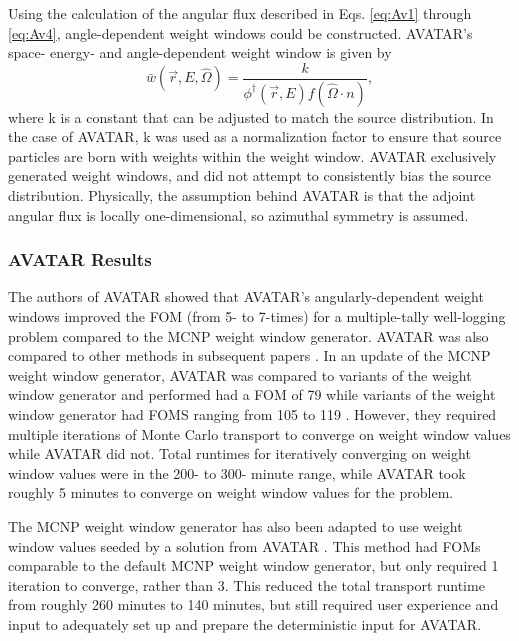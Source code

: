 Using the calculation of the angular flux described in Eqs. \eqref{eq:Av1}
through \eqref{eq:Av4}, angle-dependent weight windows could be constructed.
AVATAR's space- energy- and angle-dependent weight window is given by
\begin{equation}
\bar {w} (\vec{r},E,\hat\Omega) = \frac{k}{\phi^{\dagger}(\vec{r},E)
                                  f(\hat\Omega \cdot n)},
\end{equation}
where k is a constant that can be adjusted to match the source distribution.
In the case of AVATAR, k was used as a normalization factor to ensure that
source particles are born with weights within the weight window.
AVATAR exclusively generated weight windows, and did not attempt to consistently
bias the source
distribution. Physically, the assumption behind AVATAR is that the adjoint
angular flux
is locally one-dimensional, so azimuthal symmetry is assumed.

\subsubsection*{AVATAR Results}

The authors of AVATAR showed that AVATAR's angularly-dependent
weight windows improved the FOM (from 5- to 7-times) for a multiple-tally well-logging
problem compared to the MCNP weight window generator. AVATAR was also compared
to other methods in subsequent papers \cite{evans_enhanced_1998}. In an
update of the MCNP weight window generator, AVATAR was compared to variants of
the weight window generator and performed had a FOM of 79 while variants of the
weight window generator had FOMS ranging from 105 to 119
\cite{evans_enhanced_1998}. However, they required
multiple iterations of Monte Carlo transport to converge on weight window values
while AVATAR did not. Total runtimes for iteratively converging on weight window
values were in the 200- to 300- minute range, while AVATAR took roughly 5
minutes to converge on weight window values for the problem.

The MCNP weight window generator has also been adapted to use weight window
values seeded by a solution from AVATAR \cite{evans_enhanced_1998}. This method
had FOMs comparable to the default MCNP weight window generator, but only
required 1 iteration to converge, rather than 3. This reduced the total
transport runtime from roughly 260 minutes to 140 minutes, but still required
user experience and input to adequately set up and prepare the deterministic
input for AVATAR.

